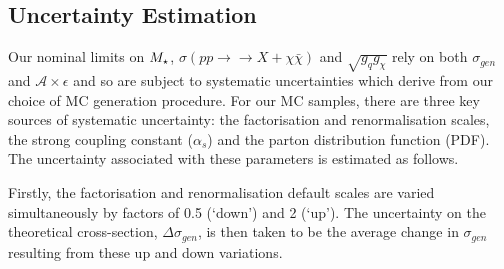\subsection{Uncertainty Estimation}
\begin{flushleft}
Our nominal limits on $M_{\star}$, $\sigma(pp \rightarrow \rightarrow{X} + \chi\bar{\chi})$ and $\sqrt{g_{q}g_{\chi}}$ rely on both $\sigma_{gen}$ and $\mathcal{A}\times\epsilon$ and so are subject to systematic uncertainties which derive from our choice of MC generation procedure. For our MC samples, there are three key sources of systematic uncertainty: the factorisation and renormalisation scales, the strong coupling constant ($\alpha_{s}$) and the parton distribution function (PDF). The uncertainty associated with these parameters is estimated as follows.
\bigskip

%
%
Firstly, the factorisation and renormalisation default scales are varied simultaneously by factors of 0.5 (`down') and 2 (`up'). The uncertainty on the theoretical cross-section, $\Delta \sigma_{gen}$, is then taken to be the average change in $\sigma_{gen}$ resulting from these up and down variations.
\bigskip


\end{flushleft}
